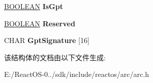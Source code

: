 \begin{DoxyCompactItemize}
\mbox{\label{struct___a_r_c___d_i_s_k___s_i_g_n_a_t_u_r_e_a39020920c6781787f4c09331bb4ab7b4}} 
\hyperlink{_processor_bind_8h_a112e3146cb38b6ee95e64d85842e380a}{B\+O\+O\+L\+E\+AN} {\bfseries Is\+Gpt}
\item 
\mbox{\label{struct___a_r_c___d_i_s_k___s_i_g_n_a_t_u_r_e_a6ff25ba301258cee92055fc5d3c351e6}} 
\hyperlink{_processor_bind_8h_a112e3146cb38b6ee95e64d85842e380a}{B\+O\+O\+L\+E\+AN} {\bfseries Reserved}
\item 
\mbox{\label{struct___a_r_c___d_i_s_k___s_i_g_n_a_t_u_r_e_ad9cf51f0dae077f49abb49ad05bae5a8}} 
C\+H\+AR {\bfseries Gpt\+Signature} \mbox{[}16\mbox{]}
\end{DoxyCompactItemize}


该结构体的文档由以下文件生成\+:\begin{DoxyCompactItemize}
\item 
E\+:/\+React\+O\+S-\/0../sdk/include/reactos/arc/arc.\+h\end{DoxyCompactItemize}
